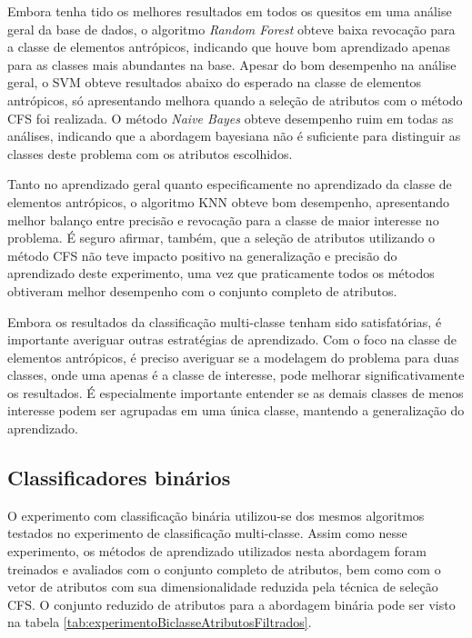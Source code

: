Embora tenha tido os melhores resultados em todos os quesitos em uma análise geral da base de dados, o algoritmo \textit{Random Forest} obteve baixa revocação para a classe de elementos antrópicos, indicando que houve bom aprendizado apenas para as classes mais abundantes na base. Apesar do bom desempenho na análise geral, o SVM obteve resultados abaixo do esperado na classe de elementos antrópicos, só apresentando melhora quando a seleção de atributos com o método CFS foi realizada. O método \textit{Naive Bayes} obteve desempenho ruim em todas as análises, indicando que a abordagem bayesiana não é suficiente para distinguir as classes deste problema com os atributos escolhidos.

Tanto no aprendizado geral quanto especificamente no aprendizado da classe de elementos antrópicos, o algoritmo KNN obteve bom desempenho, apresentando melhor balanço entre precisão e revocação para a classe de maior interesse no problema. É seguro afirmar, também, que a seleção de atributos utilizando o método CFS não teve impacto positivo na generalização e precisão do aprendizado deste experimento, uma vez que praticamente todos os métodos obtiveram melhor desempenho com o conjunto completo de atributos.

Embora os resultados da classificação multi-classe tenham sido satisfatórias, é importante averiguar outras estratégias de aprendizado. Com o foco na classe de elementos antrópicos, é preciso averiguar se a modelagem do problema para duas classes, onde uma apenas é a classe de interesse, pode melhorar significativamente os resultados. É especialmente importante entender se as demais classes de menos interesse podem ser agrupadas em uma única classe, mantendo a generalização do aprendizado.

\subsection{Classificadores binários}

O experimento com classificação binária utilizou-se dos mesmos algoritmos testados no experimento de classificação multi-classe. Assim como nesse experimento, os métodos de aprendizado utilizados nesta abordagem foram treinados e avaliados com o conjunto completo de atributos, bem como com o vetor de atributos com sua dimensionalidade reduzida pela técnica de seleção CFS. O conjunto reduzido de atributos para a abordagem binária pode ser visto na tabela \ref{tab:experimentoBiclasseAtributosFiltrados}.

